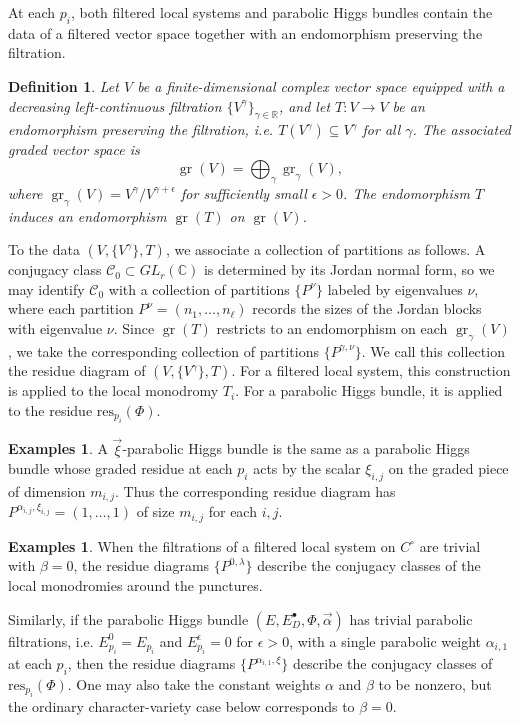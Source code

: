 \documentclass[11pt]{amsart}
\theoremstyle{plain}
\newtheorem{definition}[theorem]{Definition}
\theoremstyle{definition}
\newtheorem{exmp}[theorem]{Examples}
\theoremstyle{remark}
\newcommand{\C}{\mathbb C}
\def\C{\mathbb{C}}
\def\res{\mathrm{res}}
\begin{document}
At each $p_i$, both filtered local systems and parabolic Higgs bundles contain the data of a filtered vector space together with an endomorphism preserving the filtration.

\begin{definition}
	Let $V$ be a finite-dimensional complex vector space equipped with a decreasing left-continuous filtration $\{V^\gamma\}_{\gamma\in\mathbb R}$, and let $T:V\to V$ be an endomorphism preserving the filtration, i.e. $T(V^\gamma)\subseteq V^\gamma$ for all $\gamma$. The associated graded vector space is
	\[
	\operatorname{gr}(V)=\bigoplus_\gamma \operatorname{gr}_\gamma(V),
	\]
	where $\operatorname{gr}_\gamma(V)=V^\gamma/V^{\gamma+\epsilon}$ for sufficiently small $\epsilon>0$. The endomorphism $T$ induces an endomorphism $\operatorname{gr}(T)$ on $\operatorname{gr}(V)$.
\end{definition}

To the data $(V,\{V^\gamma\},T)$, we associate a collection of partitions as follows. A conjugacy class $\mathcal C_0\subset GL_r(\C)$ is determined by its Jordan normal form, so we may identify $\mathcal C_0$ with a collection of partitions $\{P^\nu\}$ labeled by eigenvalues $\nu$, where each partition $P^\nu=(n_1,\ldots,n_\ell)$ records the sizes of the Jordan blocks with eigenvalue $\nu$. Since $\operatorname{gr}(T)$ restricts to an endomorphism on each $\operatorname{gr}_\gamma(V)$, we take the corresponding collection of partitions $\{P^{\gamma,\nu}\}$. We call this collection the residue diagram of $(V,\{V^\gamma\},T)$. For a filtered local system, this construction is applied to the local monodromy $T_i$. For a parabolic Higgs bundle, it is applied to the residue $\res_{p_i}(\Phi)$.

\begin{exmp}\label{exmp:xipar}
	A $\vec\xi$-parabolic Higgs bundle is the same as a parabolic Higgs bundle whose graded residue at each $p_i$ acts by the scalar $\xi_{i,j}$ on the graded piece of dimension $m_{i,j}$. Thus the corresponding residue diagram has $
	P^{\alpha_{i,j},\xi_{i,j}}=(1,\ldots,1)$ of size $m_{i,j}$ for each $i,j$.
\end{exmp}

\begin{exmp}\label{exmp:trivialfiltrations}
	When the filtrations of a filtered local system on $C^\circ$ are trivial with $\beta=0$, the residue diagrams $\{P^{0,\lambda}\}$ describe the conjugacy classes of the local monodromies around the punctures.

	Similarly, if the parabolic Higgs bundle $(E,E_D^\bullet,\Phi,\vec\alpha)$ has trivial parabolic filtrations, i.e. $E_{p_i}^0=E_{p_i}$ and $E_{p_i}^{\epsilon}=0$ for $\epsilon>0$, with a single parabolic weight $\alpha_{i,1}$ at each $p_i$, then the residue diagrams $\{P^{\alpha_{i,1},\xi}\}$ describe the conjugacy classes of $\res_{p_i}(\Phi)$. One may also take the constant weights $\alpha$ and $\beta$ to be nonzero, but the ordinary character-variety case below corresponds to $\beta=0$.
\end{exmp}
\end{document}

